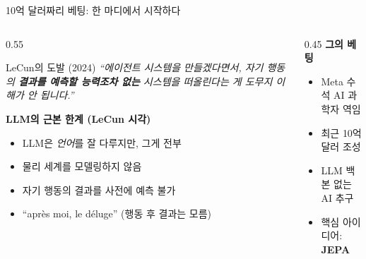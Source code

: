 \documentclass[aspectratio=169,10pt]{beamer}
\begin{document}
\begin{frame}{10억 달러짜리 베팅: 한 마디에서 시작하다}
\begin{columns}[T]
\begin{column}{0.55\textwidth}
\begin{block}{LeCun의 도발 (2024)}
\textit{``에이전트 시스템을 만들겠다면서, 자기 행동의 \textbf{결과를 예측할 능력조차 없는} 시스템을 떠올린다는 게 도무지 이해가 안 됩니다.''}
\end{block}

\vspace{0.6em}
\textbf{LLM의 근본 한계 (LeCun 시각)}
\begin{itemize}
  \item LLM은 \emph{언어}를 잘 다루지만, 그게 전부
  \item 물리 세계를 \alert{모델링하지 않음}
  \item 자기 행동의 결과를 사전에 \alert{예측 불가}
  \item ``après moi, le déluge'' (행동 후 결과는 모름)
\end{itemize}
\end{column}
\begin{column}{0.45\textwidth}
\textbf{그의 베팅}
\begin{itemize}
  \item Meta 수석 AI 과학자 역임
  \item 최근 10억 달러 조성
  \item \alert{LLM 백본 없는} AI 추구
  \item 핵심 아이디어: \textbf{JEPA}
\end{itemize}

\vspace{0.8em}
\end{column}
\end{columns}
\end{frame}
\end{document}
